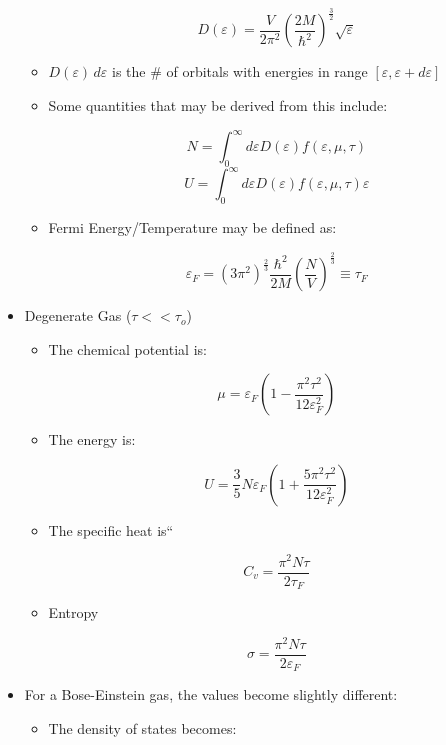 \begin{itemize}
\begin{itemize}
        $$D(\varepsilon)=\frac{V}{2\pi^2}\left( \frac{2M}{\hbar^2} \right)^{\frac{3}{2}}\sqrt{\varepsilon}$$

      \item $D(\varepsilon)\,d\varepsilon$ is the \# of orbitals with energies in range $[\varepsilon,\varepsilon+d\varepsilon]$

      \item Some quantities that may be derived from this include:

        $$N=\int_0^\infty d\varepsilon D(\varepsilon)f(\varepsilon,\mu,\tau)$$
        $$U=\int_0^\infty d\varepsilon D(\varepsilon)f(\varepsilon,\mu,\tau)\varepsilon$$

      \item Fermi Energy/Temperature may be defined as:

        $$\varepsilon_F=\left( 3\pi^2 \right)^{\frac{2}{3}}\frac{\hbar^2}{2M}\left( \frac{N}{V} \right)^{\frac{2}{3}}\equiv\tau_F$$

    \end{itemize}

  \item Degenerate Gas ($\tau << \tau_o$)

    \begin{itemize}

      \item The chemical potential is:

        $$\mu=\varepsilon_F\left( 1-\frac{\pi^2\tau^2}{12\varepsilon_F^2} \right)$$

      \item The energy is:

        $$U=\frac{3}{5}N\varepsilon_F\left( 1+\frac{5\pi^2\tau^2}{12\varepsilon_F^2} \right)$$

      \item The specific heat is``

        $$C_v=\frac{\pi^2N\tau}{2\tau_F}$$

      \item Entropy

        $$\sigma=\frac{\pi^2N\tau}{2\varepsilon_F}$$

    \end{itemize}

  \item For a Bose-Einstein gas, the values become slightly different:

    \begin{itemize}

      \item The density of states becomes:


\end{itemize}
\end{itemize}

